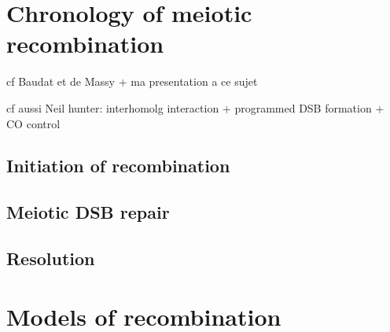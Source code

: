 %
%
%
%







\section{Chronology of meiotic recombination}
cf Baudat et de Massy + ma presentation a ce sujet

cf aussi Neil hunter: interhomolg interaction + programmed DSB formation + CO control

\subsection{Initiation of recombination}
\subsection{Meiotic DSB repair}
\subsection{Resolution}



\section{Models of recombination}

